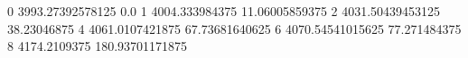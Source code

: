 0 3993.27392578125 0.0
1 4004.333984375 11.06005859375
2 4031.50439453125 38.23046875
4 4061.0107421875 67.73681640625
6 4070.54541015625 77.271484375
8 4174.2109375 180.93701171875
